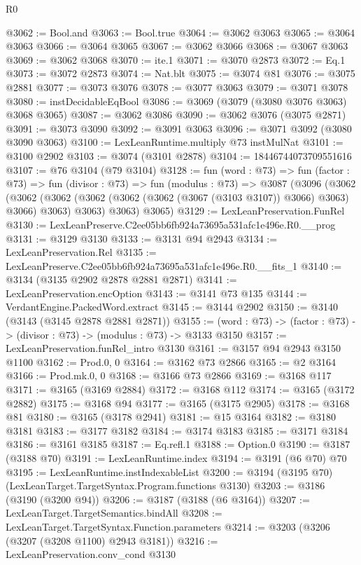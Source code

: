 \begin{lexlean}{R0}
\begin{coremodule}
@3062 := Bool.and
@3063 := Bool.true
@3064 := @3062 @3063
@3065 := @3064 @3063
@3066 := @3064 @3065
@3067 := @3062 @3066
@3068 := @3067 @3063
@3069 := @3062 @3068
@3070 := ite.{1}
@3071 := @3070 @2873
@3072 := Eq.{1}
@3073 := @3072 @2873
@3074 := Nat.blt
@3075 := @3074 @81
@3076 := @3075 @2881
@3077 := @3073 @3076
@3078 := @3077 @3063
@3079 := @3071 @3078
@3080 := instDecidableEqBool
@3086 := @3069 (@3079 (@3080 @3076 @3063) @3068 @3065)
@3087 := @3062 @3086
@3090 := @3062 @3076 (@3075 @2871)
@3091 := @3073 @3090
@3092 := @3091 @3063
@3096 := @3071 @3092 (@3080 @3090 @3063)
@3100 := LexLeanRuntime.multiply @73 instMulNat
@3101 := @3100 @2902
@3103 := @3074 (@3101 @2878)
@3104 := 18446744073709551616
@3107 := @76 @3104 (@79 @3104)
@3128 := fun (word : @73) =>
  fun (factor : @73) =>
  fun (divisor : @73) =>
  fun (modulus : @73) =>
  @3087
    (@3096
      (@3062
        (@3062 (@3062 (@3062 (@3062 (@3062 (@3067 (@3103 @3107)) @3066) @3063) @3066) @3063) @3063)
        @3063)
      @3065)
@3129 := LexLeanPreservation.FunRel
@3130 := LexLeanPreserve.C2ee05bb6fb924a73695a531afc1e496e.R0.__prog
@3131 := @3129 @3130
@3133 := @3131 @94 @2943
@3134 := LexLeanPreservation.Rel
@3135 := LexLeanPreserve.C2ee05bb6fb924a73695a531afc1e496e.R0.__fits_1
@3140 := @3134 (@3135 @2902 @2878 @2881 @2871)
@3141 := LexLeanPreservation.encOption
@3143 := @3141 @73 @135
@3144 := VerdantEngine.PackedWord.extract
@3145 := @3144 @2902
@3150 := @3140 (@3143 (@3145 @2878 @2881 @2871))
@3155 := (word : @73) -> (factor : @73) -> (divisor : @73) -> (modulus : @73) -> @3133 @3150
@3157 := LexLeanPreservation.funRel_intro @3130
@3161 := @3157 @94 @2943 @3150 @1100
@3162 := Prod.{0, 0}
@3164 := @3162 @73 @2866
@3165 := @2 @3164
@3166 := Prod.mk.{0, 0}
@3168 := @3166 @73 @2866
@3169 := @3168 @117
@3171 := @3165 (@3169 @2884)
@3172 := @3168 @112
@3174 := @3165 (@3172 @2882)
@3175 := @3168 @94
@3177 := @3165 (@3175 @2905)
@3178 := @3168 @81
@3180 := @3165 (@3178 @2941)
@3181 := @15 @3164
@3182 := @3180 @3181
@3183 := @3177 @3182
@3184 := @3174 @3183
@3185 := @3171 @3184
@3186 := @3161 @3185
@3187 := Eq.refl.{1}
@3188 := Option.{0}
@3190 := @3187 (@3188 @70)
@3191 := LexLeanRuntime.index
@3194 := @3191 (@6 @70) @70
@3195 := LexLeanRuntime.instIndexableList
@3200 := @3194 (@3195 @70) (LexLeanTarget.TargetSyntax.Program.functions @3130)
@3203 := @3186 (@3190 (@3200 @94))
@3206 := @3187 (@3188 (@6 @3164))
@3207 := LexLeanTarget.TargetSemantics.bindAll
@3208 := LexLeanTarget.TargetSyntax.Function.parameters
@3214 := @3203 (@3206 (@3207 (@3208 @1100) @2943 @3181))
@3216 := LexLeanPreservation.conv_cond @3130

\end{coremodule}
\end{lexlean}
